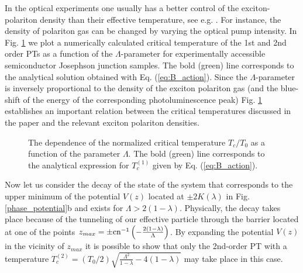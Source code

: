 \documentclass[aps, pre, preprint, groupedaddress, superscriptaddress, showkeys, showpacs] {revtex4-1}
\begin{document}
In the optical experiments one usually has a better control of the exciton-polariton density than their effective temperature, see e.g. \cite{Sanvitto,Guillet}.
For instance, the density of polariton gas can be changed by varying the optical pump intensity.
In Fig. \ref{pic:temperatures} we plot a numerically calculated critical temperature of the 1st and 2nd order PTs as a function of the $\Lambda$-parameter for experimentally accessible semiconductor Josephson junction samples.
The bold (green) line corresponds to the analytical solution obtained with  Eq. (\ref{eq:B_action}).
Since the $\Lambda$-parameter is inversely proportional to the density of the exciton polariton gas (and the blue-shift of the energy of the corresponding photoluminescence peak) Fig. \ref{pic:temperatures} establishes an important relation between the critical temperatures discussed in the paper and the relevant exciton polariton densities.
%
\begin{figure}[ht]
\caption
{The dependence of the normalized critical temperature $T_{c}/T_{0}$ as a function of the parameter $\Lambda$. The bold (green) line corresponds to the analytical expression for  $T_{c}^{(1)}$ given by Eq. (\ref{eq:B_action}).
\label{pic:temperatures}}
\end{figure}
%

Now let us consider the decay of the state of the system that corresponds to the upper minimum of the potential $V(z)$ located at $\pm 2K(\lambda)$ in Fig.\ref{phase_potential}b and exists for $\Lambda > 2(1 - \lambda)$. Physically, the decay takes place because of the tunneling of our effective particle through the barrier located at one of the points $z_{max} = \pm \textrm{cn}^{-1} \left( -\frac{2(1 - \lambda)}{\Lambda} \right)$.
By expanding the potential $V(z)$ in the vicinity of $z_{max}$ it is possible to show that only the 2nd-order PT with a temperature $T_{c}^{(2)} = (T_{0}/ 2) \sqrt{\frac{\Lambda^2}{1 - \lambda} - 4(1 - \lambda)}$ may take place in this case.
\end{document}
